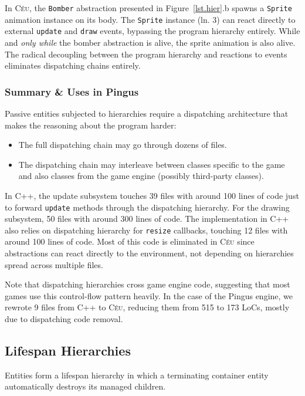 \documentclass{vgtc}                          %
\newcommand{\CEU}{\textsc{C\'{e}u}\xspace}
\newcommand{\code}[1] {{\small{\texttt{#1}}}}
\begin{document}
In \CEU, the \code{Bomber} abstraction presented in Figure~\ref{lst.hier}.b
spawns a \code{Sprite} animation instance on its body.
%
The \code{Sprite} instance (ln. 3) can react directly to external \code{update}
and \code{draw} events, bypassing the program hierarchy entirely.
While and \emph{only while} the bomber abstraction is alive, the sprite
animation is also alive.
The radical decoupling between the program hierarchy and reactions to events
eliminates dispatching chains entirely.

\subsubsection{Summary \& Uses in Pingus}

Passive entities subjected to hierarchies require a dispatching architecture
that makes the reasoning about the program harder:

\begin{itemize}
\item The full dispatching chain may go through dozens of files.
\item The dispatching chain may interleave between classes specific to the game
      and also classes from the game engine (possibly third-party classes).
\end{itemize}

In C++, the update subsystem touches 39 files with around 100 lines of code
just to forward \code{update} methods through the dispatching hierarchy.
For the drawing subsystem, 50 files with around 300 lines of code.
The implementation in C++ also relies on dispatching hierarchy for
\code{resize} callbacks, touching 12 files with around 100 lines of code.
%
Most of this code is eliminated in \CEU since abstractions can react directly
to the environment, not depending on hierarchies spread across multiple files.

Note that dispatching hierarchies cross game engine code, suggesting that most
games use this control-flow pattern heavily.
In the case of the Pingus engine, we rewrote 9 files from C++ to \CEU, reducing
them from 515 to 173 LoCs, mostly due to dispatching code removal.

\subsection{Lifespan Hierarchies}
\label{sec.pats.lifespan}

    Entities form a lifespan hierarchy in which a terminating container entity
    automatically destroys its managed children.
\end{document}
